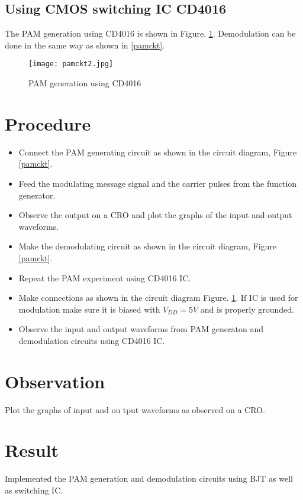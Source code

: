 \subsection*{Using CMOS switching IC CD4016}
The PAM generation using CD4016 is shown in Figure. \ref{pamckt2}. Demodulation can be done in the same way as shown in \ref{pamckt}.

\begin{figure}
\texttt{[image: pamckt2.jpg]}
\caption{PAM generation using CD4016}
\label{pamckt2}
\end{figure}

\section*{Procedure}
\begin{itemize}
\item
Connect the PAM generating circuit as shown in the circuit diagram, Figure \ref{pamckt}.
\item
Feed the modulating message signal and the carrier pulses from the function generator.
\item
Observe the output on a CRO and plot the graphs of the input and output waveforms.
\item
Make the demodulating circuit as shown in the circuit diagram, Figure \ref{pamckt}.
\item
Repeat the PAM experiment using CD4016 IC.
\item
Make connections as shown in the circuit diagram Figure. \ref{pamckt2}. If IC is used for modulation make sure it is biased with $V_{DD}=5V$ and is properly grounded.
\item
Observe the input and output waveforms from PAM generaton and demodulation circuits using CD4016 IC.

\end{itemize}
\section*{Observation}
Plot the graphs of input and ou
tput waveforms as observed on a CRO.
\section*{Result}

Implemented the PAM generation and demodulation circuits using BJT as well as switching IC.